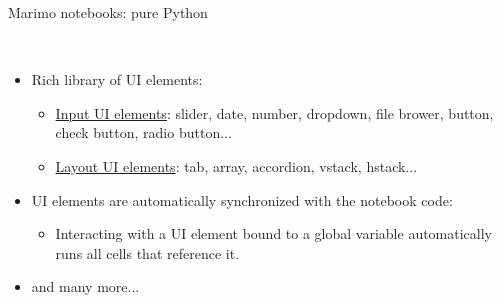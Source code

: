 \documentclass[11pt, serif, mathserif, compress]{beamer}  %
\begin{document}
\begin{frame}{Marimo notebooks: pure Python}

  \begin {bclogo}[noborder=true, couleur=gray!20, couleurBarre=Chocolate, logo=\raisebox{1mm}{\,\huge😍}, marge=0, margeG=-0.5, margeD=-0.5]
    {\ }\smallskip

    \begin{itemize}\setlength\itemsep{3mm}
      
    \item Rich library of UI elements:
      
      \begin{itemize}\setlength\itemsep{1mm}        
      \item<2-> \href{https://docs.marimo.io/api/inputs/}{Input UI elements}: slider, date, number, dropdown, file brower, button, check button, radio button...
      \item<3-> \href{https://docs.marimo.io/api/layouts/}{Layout UI elements}: tab, array, accordion, vstack, hstack...
      \end{itemize}

    \item<4-> UI elements are automatically synchronized with the notebook code:
    
      \begin{itemize}\setlength\itemsep{1mm}        
      \item Interacting with a UI element bound to a global variable automatically runs all cells that reference it.
      \end{itemize}
  
    \item<5-> and many more... 

    \end{itemize}
  \end{bclogo}

\end{frame}
\end{document}
